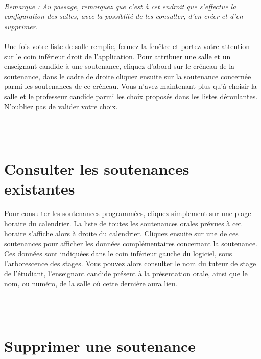 \documentclass[a4paper,10pt]{book}
\begin{document}
	\paragraph{}  
	  \textit{Remarque : Au passage, remarquez que c'est à cet endroit que s'effectue la configuration des salles, avec la possiblité de les consulter, d'en créer et d'en supprimer.}
	  
	\paragraph{}
	  Une fois votre liste de salle remplie, fermez la fenêtre et portez votre attention sur le coin inférieur droit de l'application.
	  Pour attribuer une salle et un enseignant candide à une soutenance, cliquez d'abord sur le créneau de la soutenance, dans le cadre de droite cliquez ensuite sur la soutenance concernée parmi les soutenances de ce créneau.
	  Vous n'avez maintenant plus qu'à choisir la salle et le professeur candide parmi les choix proposés dans les listes déroulantes.
	  N'oubliez pas de valider votre choix.
	  
	
	~\\~\\
    \section{Consulter les soutenances existantes}
      \paragraph{}
	Pour consulter les soutenances programmées, cliquez simplement sur une plage horaire du calendrier.
	La liste de toutes les soutenances orales prévues à cet horaire s'affiche alors à droite du calendrier.
	Cliquez ensuite sur une de ces soutenances pour afficher les données complémentaires concernant la soutenance.
	Ces données sont indiquées dans le coin inférieur gauche du logiciel, sous l'arborescence des stages.
	Vous pouvez alors consulter le nom du tuteur de stage de l'étudiant, l'enseignant candide présent à la présentation orale, ainsi que le nom, ou numéro, de la salle où cette dernière aura lieu.
      
      ~\\~\\
    \section{Supprimer une soutenance}
\end{document}
